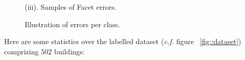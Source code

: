 \documentclass[a4paper, 11pt]{article}
\begin{document}
\begin{figure}
\begin{center}
{{\begin{subfloatrow}[4]
					\end{subfloatrow}
				}
				{
					\caption*{(iii). Samples of Facet errors.}
				}
			}
			{
				\caption{\label{fig::samples}Illustration of errors per class.}
			}
		\end{center}
	\end{figure}
	\clearpage


	Here are some statistics over the labelled dataset (\textit{c.f.} figure ~\ref{fig::dataset}) comprizing $502$ buildings:
\end{document}
